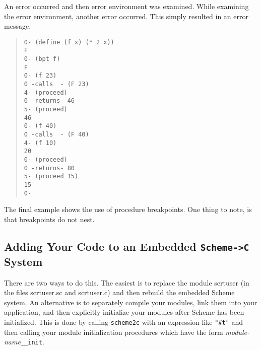 \documentclass[12pt]{article}
\begin{document}
An error occurred and then error environment was examined.  While
examining the error environment, another error occurred.  This simply
resulted in an error message.
\begin{quote}
\begin{verbatim}
0- (define (f x) (* 2 x))
F
0- (bpt f)
F
0- (f 23)
0 -calls  - (F 23)
4- (proceed)
0 -returns- 46
5- (proceed)
46
0- (f 40)
0 -calls  - (F 40)
4- (f 10)
20
0- (proceed)
0 -returns- 80
5- (proceed 15)
15
0-
\end{verbatim}
\end{quote}
The final example shows the use of procedure breakpoints.  One thing
to note, is that breakpoints do not nest.

\subsection*{Adding Your Code to an Embedded \texttt{Scheme->C} System}

There are two ways to do this.  The easiest is to replace the
module scrtuser (in the files scrtuser.sc and scrtuser.c) and
then rebuild the embedded Scheme system.  An alternative is to
separately compile your modules, link them into your
application, and then explicitly initialize your modules after
Scheme has been initialized.  This is done by calling \texttt{scheme2c}
with an expression like \texttt{"\#t"} and then calling your module
initialization procedures which have the form
\emph{module-name}\texttt{\_\_init}.
\end{document}
